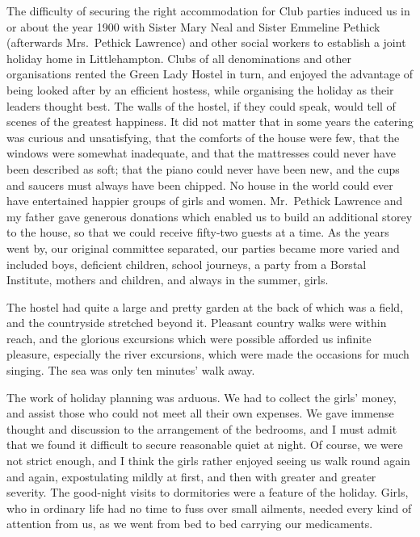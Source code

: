 The difficulty of securing the right accommodation for
Club parties induced us in or about the year 1900 with
Sister Mary Neal and Sister Emmeline Pethick (afterwards
Mrs.\ Pethick Lawrence) and other social workers
to establish a joint holiday home in Littlehampton. Clubs
of all denominations and other organisations rented the
Green Lady Hostel in turn, and enjoyed the advantage
of being looked after by an efficient hostess, while organising
the holiday as their leaders thought best. The walls
of the hostel, if they could speak, would tell of scenes of
the greatest happiness. It did not matter that in some
years the catering was curious and unsatisfying, that the
comforts of the house were few, that the windows were
somewhat inadequate, and that the mattresses could
never have been described as soft; that the piano could
never have been new, and the cups and saucers must
always have been chipped. No house in the world could
ever have entertained happier groups of girls and women.
Mr.\ Pethick Lawrence and my father gave generous donations
which enabled us to build an additional storey to the
house, so that we could receive fifty-two guests at a time.
As the years went by, our original committee separated,
our parties became more varied and included boys,
deficient children, school journeys, a party from a Borstal
Institute, mothers and children, and always in the
summer, girls.

The hostel had quite a large and pretty garden at the
back of which was a field, and the countryside stretched
beyond it. Pleasant country walks were within reach, and
the glorious excursions which were possible afforded us
infinite pleasure, especially the river excursions, which
were made the occasions for much singing. The sea was
only ten minutes’ walk away.

The work of holiday planning was arduous. We had
to collect the girls’ money, and assist those who could
not meet all their own expenses. We gave immense
thought and discussion to the arrangement of the bedrooms,
and I must admit that we found it difficult to
secure reasonable quiet at night. Of course, we were not
strict enough, and I think the girls rather enjoyed seeing
us walk round again and again, expostulating mildly at
first, and then with greater and greater severity. The
good-night visits to dormitories were a feature of the
holiday. Girls, who in ordinary life had no time to fuss
over small ailments, needed every kind of attention from
us, as we went from bed to bed carrying our medicaments.

